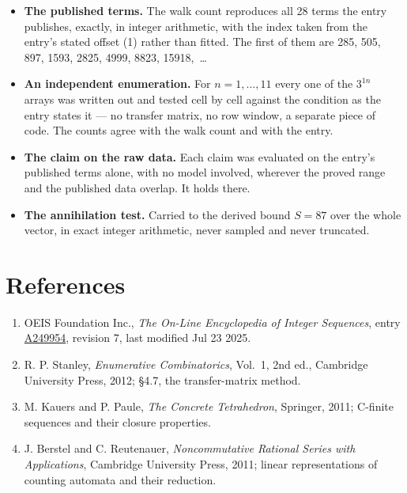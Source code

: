 \documentclass[11pt]{article}
\theoremstyle{definition}
\begin{document}
\begin{itemize}

\item {\bfseries The published terms.} The walk count reproduces all 28 terms the entry publishes, exactly, in integer arithmetic, with the index taken from the entry's stated offset (1) rather than fitted. The first of them are 285, 505, 897, 1593, 2825, 4999, 8823, 15918,~\dots

\item {\bfseries An independent enumeration.} For $n = 1,\dots,11$ every one of the $3^{1n}$ arrays was written out and tested cell by cell against the condition as the entry states it --- no transfer matrix, no row window, a separate piece of code. The counts agree with the walk count and with the entry.

\item {\bfseries The claim on the raw data.} Each claim was evaluated on the entry's published terms alone, with no model involved, wherever the proved range and the published data overlap. It holds there.

\item {\bfseries The annihilation test.} Carried to the derived bound $S = 87$ over the whole vector, in exact integer arithmetic, never sampled and never truncated.

\end{itemize}

\section{References}

\begin{enumerate}

\item OEIS Foundation Inc., \emph{The On-Line Encyclopedia of Integer Sequences}, entry \href{https://oeis.org/A249954}{A249954}, revision 7, last modified Jul 23 2025.

\item R. P. Stanley, \emph{Enumerative Combinatorics}, Vol.~1, 2nd ed., Cambridge University Press, 2012; \S4.7, the transfer-matrix method.

\item M. Kauers and P. Paule, \emph{The Concrete Tetrahedron}, Springer, 2011; C-finite sequences and their closure properties.

\item J. Berstel and C. Reutenauer, \emph{Noncommutative Rational Series with Applications}, Cambridge University Press, 2011; linear representations of counting automata and their reduction.

\end{enumerate}
\end{document}
